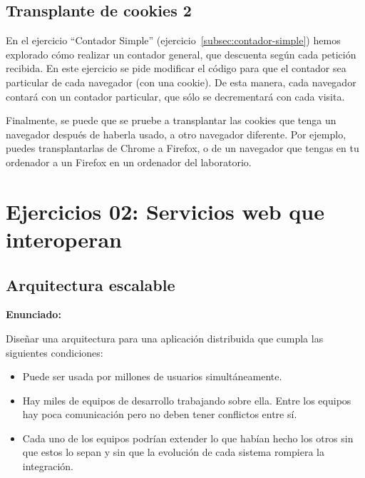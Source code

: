 \subsection{Transplante de cookies 2}
\label{subsec:transplante-cookies2}

En el ejercicio ``Contador Simple'' (ejercicio~\ref{subsec:contador-simple}) hemos explorado cómo realizar un contador general, que descuenta según cada petición recibida. En este ejercicio se pide modificar el código para que el contador sea particular de cada navegador (con una cookie). De esta manera, cada navegador contará con un contador particular, que sólo se decrementará con cada visita.

Finalmente, se puede que se pruebe a transplantar las cookies que tenga un navegador después de haberla usado, a otro navegador diferente. Por ejemplo, puedes transplantarlas de Chrome a Firefox, o de un navegador que tengas en tu ordenador a un Firefox en un ordenador del laboratorio.


\section{Ejercicios 02: Servicios web que interoperan}


\subsection{Arquitectura escalable}
\label{subsec:arq-escalable}

\textbf{Enunciado:}

Diseñar una arquitectura para una aplicación distribuida que cumpla las siguientes condiciones:

\begin{itemize}
\item Puede ser usada por millones de usuarios simultáneamente.
\item Hay miles de equipos de desarrollo trabajando sobre ella. Entre los equipos hay poca comunicación pero no deben tener conflictos entre sí.
\item Cada uno de los equipos podrían extender lo que habían hecho los otros sin que estos lo sepan y sin que la evolución de cada sistema rompiera la integración.
\end{itemize}

